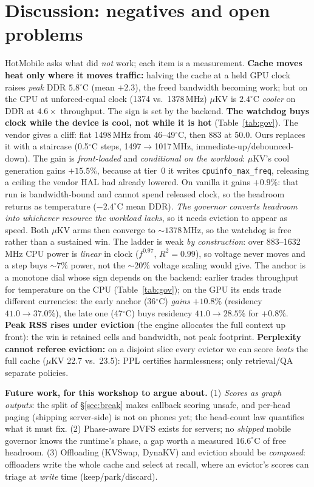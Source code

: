 \documentclass[sigconf,10pt]{acmart}
\begin{document}
\section{Discussion: negatives and open problems}
\label{sec:disc}
HotMobile asks what did \emph{not} work; each item is a measurement. \textbf{Cache moves heat only where it moves traffic:} halving the cache at a held GPU clock raises \emph{peak} DDR $5.8^\circ$C (mean $+2.3$), the freed bandwidth becoming work; but on the CPU at unforced-equal clock (1374 vs.\ 1378\,MHz) $\mu$KV is $2.4^\circ$C \emph{cooler} on DDR at $4.6\times$ throughput. The sign is set by the backend. \textbf{The watchdog buys clock while the device is cool, not while it is hot} (Table~\ref{tab:gov}). The vendor gives a cliff: flat 1498\,MHz from 46--49$^\circ$C, then 883 at 50.0. Ours replaces it with a staircase (0.5$^\circ$C steps, 1497$\to$1017\,MHz, immediate-up/debounced-down). The gain is \emph{front-loaded} and \emph{conditional on the workload}: $\mu$KV's cool generation gains $+15.5\%$, because at tier~0 it writes \texttt{cpuinfo\_max\_freq}, releasing a ceiling the vendor HAL had already lowered. On vanilla it gains $+0.9\%$: that run is bandwidth-bound and cannot spend released clock, so the headroom returns as temperature ($-2.4^\circ$C mean DDR). \emph{The governor converts headroom into whichever resource the workload lacks}, so it needs eviction to appear as speed. Both $\mu$KV arms then converge to ${\sim}1378$\,MHz, so the watchdog is free rather than a sustained win. The ladder is weak \emph{by construction}: over 883--1632\,MHz CPU power is \emph{linear} in clock ($f^{0.97}$, $R^2{=}0.99$), so voltage never moves and a step buys ${\sim}7\%$ power, not the ${\sim}20\%$ voltage scaling would give. The anchor is a monotone dial whose sign depends on the backend: earlier trades throughput for temperature on the CPU (Table~\ref{tab:gov}); on the GPU its ends trade different currencies: the early anchor (36$^\circ$C) \emph{gains} $+10.8\%$ (residency $41.0\!\to\!37.0\%$), the late one (47$^\circ$C) buys residency $41.0\!\to\!28.5\%$ for $+0.8\%$. \textbf{Peak RSS rises under eviction} (the engine allocates the full context up front): the win is retained cells and bandwidth, not peak footprint. \textbf{Perplexity cannot referee eviction:} on a disjoint slice every evictor we can score \emph{beats} the full cache ($\mu$KV 22.7 vs.\ 23.5): PPL certifies harmlessness; only retrieval/QA separate policies.

\textbf{Future work, for this workshop to argue about.} (1) \emph{Scores as graph outputs}: the split of \S\ref{sec:break} makes callback scoring unsafe, and per-head paging (shipping server-side) is not on phones yet; the head-count law quantifies what it must fix. (2) Phase-aware DVFS exists for servers; no \emph{shipped} mobile governor knows the runtime's phase, a gap worth a measured $16.6^\circ$C of free headroom. (3) Offloading (KVSwap, DynaKV) and eviction should be \emph{composed}: offloaders write the whole cache and select at recall, where an evictor's scores can triage at \emph{write} time (keep/park/discard).
\end{document}
